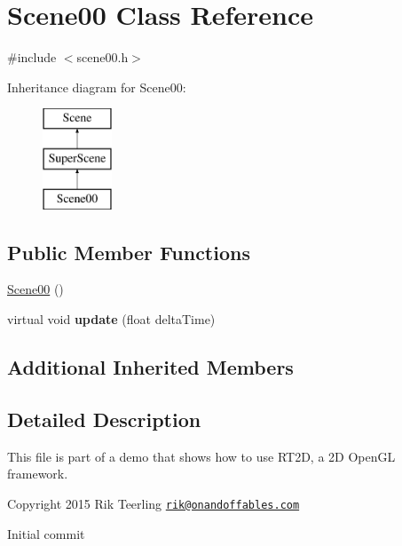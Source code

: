 \hypertarget{class_scene00}{}\section{Scene00 Class Reference}
\label{class_scene00}


{\ttfamily \#include $<$scene00.\+h$>$}

Inheritance diagram for Scene00\+:\begin{figure}[H]
\begin{center}
\leavevmode
\includegraphics[height=3.000000cm]{class_scene00}
\end{center}
\end{figure}
\subsection*{Public Member Functions}
\begin{DoxyCompactItemize}
\item 
\hyperlink{class_scene00_acf63b43edc4b904b0d94e7aa94cc2c3b}{Scene00} ()
\item 
\mbox{\label{class_scene00_aedbfa6b7ccb804ec37869b8e469bb8ad}} 
virtual void {\bfseries update} (float delta\+Time)
\end{DoxyCompactItemize}
\subsection*{Additional Inherited Members}


\subsection{Detailed Description}
This file is part of a demo that shows how to use R\+T2D, a 2D Open\+GL framework.


\begin{DoxyItemize}
\item Copyright 2015 Rik Teerling \href{mailto:rik@onandoffables.com}{\tt rik@onandoffables.\+com}
\begin{DoxyItemize}
\item Initial commit 
\end{DoxyItemize}
\end{DoxyItemize}

